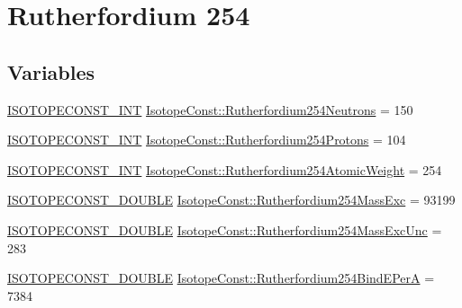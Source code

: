 \hypertarget{group___isotope_const-_rutherfordium-_rf254}{}\section{Rutherfordium 254}
\label{group___isotope_const-_rutherfordium-_rf254}
\subsection*{Variables}
\begin{DoxyCompactItemize}
\item 
\mbox{\hyperlink{group___isotope_const-_macros_ga5f18360b3e99483a35c32d789e62621c}{I\+S\+O\+T\+O\+P\+E\+C\+O\+N\+S\+T\+\_\+\+I\+NT}} \mbox{\hyperlink{group___isotope_const-_rutherfordium-_rf254_ga594c74bd990d70c7b6344c22cf31ef4a}{Isotope\+Const\+::\+Rutherfordium254\+Neutrons}} = 150
\item 
\mbox{\hyperlink{group___isotope_const-_macros_ga5f18360b3e99483a35c32d789e62621c}{I\+S\+O\+T\+O\+P\+E\+C\+O\+N\+S\+T\+\_\+\+I\+NT}} \mbox{\hyperlink{group___isotope_const-_rutherfordium-_rf254_gab07f421d1c891a7dbb07b7503111d3e7}{Isotope\+Const\+::\+Rutherfordium254\+Protons}} = 104
\item 
\mbox{\hyperlink{group___isotope_const-_macros_ga5f18360b3e99483a35c32d789e62621c}{I\+S\+O\+T\+O\+P\+E\+C\+O\+N\+S\+T\+\_\+\+I\+NT}} \mbox{\hyperlink{group___isotope_const-_rutherfordium-_rf254_ga43c9811e914f3656fd66da2078e02bdc}{Isotope\+Const\+::\+Rutherfordium254\+Atomic\+Weight}} = 254
\item 
\mbox{\hyperlink{group___isotope_const-_macros_ga8f45a7272ce02c0b4c65c44636ed719a}{I\+S\+O\+T\+O\+P\+E\+C\+O\+N\+S\+T\+\_\+\+D\+O\+U\+B\+LE}} \mbox{\hyperlink{group___isotope_const-_rutherfordium-_rf254_ga43a5f95324a4b415f714881d01d7773e}{Isotope\+Const\+::\+Rutherfordium254\+Mass\+Exc}} = 93199
\item 
\mbox{\hyperlink{group___isotope_const-_macros_ga8f45a7272ce02c0b4c65c44636ed719a}{I\+S\+O\+T\+O\+P\+E\+C\+O\+N\+S\+T\+\_\+\+D\+O\+U\+B\+LE}} \mbox{\hyperlink{group___isotope_const-_rutherfordium-_rf254_ga90cf335ae1edda3779eeebff55a6c34c}{Isotope\+Const\+::\+Rutherfordium254\+Mass\+Exc\+Unc}} = 283
\item 
\mbox{\hyperlink{group___isotope_const-_macros_ga8f45a7272ce02c0b4c65c44636ed719a}{I\+S\+O\+T\+O\+P\+E\+C\+O\+N\+S\+T\+\_\+\+D\+O\+U\+B\+LE}} \mbox{\hyperlink{group___isotope_const-_rutherfordium-_rf254_ga2b41b01c3dac710740a7985878cb8f0e}{Isotope\+Const\+::\+Rutherfordium254\+Bind\+E\+PerA}} = 7384

\end{DoxyCompactItemize}
